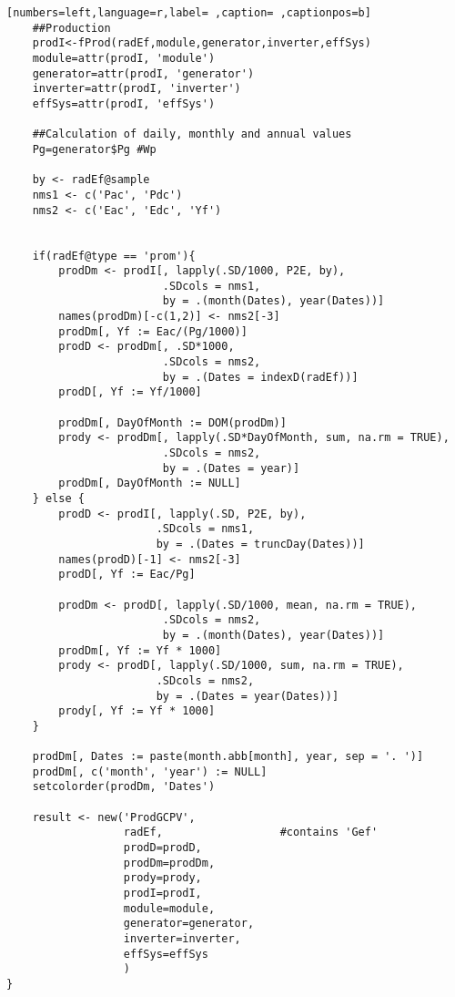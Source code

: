 \begin{lstlisting}[numbers=left,language=r,label= ,caption= ,captionpos=b]
    ##Production
    prodI<-fProd(radEf,module,generator,inverter,effSys)
    module=attr(prodI, 'module')
    generator=attr(prodI, 'generator')
    inverter=attr(prodI, 'inverter')
    effSys=attr(prodI, 'effSys')

    ##Calculation of daily, monthly and annual values
    Pg=generator$Pg #Wp

    by <- radEf@sample
    nms1 <- c('Pac', 'Pdc')
    nms2 <- c('Eac', 'Edc', 'Yf')


    if(radEf@type == 'prom'){
        prodDm <- prodI[, lapply(.SD/1000, P2E, by),
                        .SDcols = nms1,
                        by = .(month(Dates), year(Dates))]
        names(prodDm)[-c(1,2)] <- nms2[-3]
        prodDm[, Yf := Eac/(Pg/1000)]
        prodD <- prodDm[, .SD*1000,
                        .SDcols = nms2,
                        by = .(Dates = indexD(radEf))]
        prodD[, Yf := Yf/1000]

        prodDm[, DayOfMonth := DOM(prodDm)]
        prody <- prodDm[, lapply(.SD*DayOfMonth, sum, na.rm = TRUE),
                        .SDcols = nms2,
                        by = .(Dates = year)]
        prodDm[, DayOfMonth := NULL]
    } else {
        prodD <- prodI[, lapply(.SD, P2E, by),
                       .SDcols = nms1,
                       by = .(Dates = truncDay(Dates))]
        names(prodD)[-1] <- nms2[-3]
        prodD[, Yf := Eac/Pg]

        prodDm <- prodD[, lapply(.SD/1000, mean, na.rm = TRUE),
                        .SDcols = nms2,
                        by = .(month(Dates), year(Dates))]
        prodDm[, Yf := Yf * 1000]
        prody <- prodD[, lapply(.SD/1000, sum, na.rm = TRUE),
                       .SDcols = nms2,
                       by = .(Dates = year(Dates))]
        prody[, Yf := Yf * 1000]
    }

    prodDm[, Dates := paste(month.abb[month], year, sep = '. ')]
    prodDm[, c('month', 'year') := NULL]
    setcolorder(prodDm, 'Dates')

    result <- new('ProdGCPV',
                  radEf,                  #contains 'Gef'
                  prodD=prodD,
                  prodDm=prodDm,
                  prody=prody,
                  prodI=prodI,
                  module=module,
                  generator=generator,
                  inverter=inverter,
                  effSys=effSys
                  )
}
\end{lstlisting}
